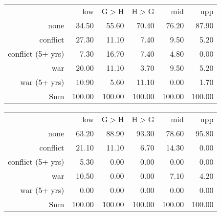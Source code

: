 \begin{table}[ht]
\centering
\begin{tabular}{rrrrrr}
\hline
                  & low    & G$>$H  & H$>$G  & mid    & upp \\
none              & 34.50  & 55.60  & 70.40  & 76.20  & 87.90 \\
conflict          & 27.30  & 11.10  & 7.40   & 9.50   & 5.20 \\
conflict (5+ yrs) & 7.30   & 16.70  & 7.40   & 4.80   & 0.00 \\
war               & 20.00  & 11.10  & 3.70   & 9.50   & 5.20 \\
war (5+ yrs)      & 10.90  & 5.60   & 11.10  & 0.00   & 1.70 \\
Sum               & 100.00 & 100.00 & 100.00 & 100.00 & 100.00 \\
\hline
\end{tabular}
\end{table}

\begin{table}[ht]
\centering
\begin{tabular}{rrrrrr}
\hline
                  & low    & G$>$H  & H$>$G  & mid    & upp \\
none              & 63.20  & 88.90  & 93.30  & 78.60  & 95.80 \\
conflict          & 21.10  & 11.10  & 6.70   & 14.30  & 0.00 \\
conflict (5+ yrs) & 5.30   & 0.00   & 0.00   & 0.00   & 0.00 \\
war               & 10.50  & 0.00   & 0.00   & 7.10   & 4.20 \\
war (5+ yrs)      & 0.00   & 0.00   & 0.00   & 0.00   & 0.00 \\
Sum               & 100.00 & 100.00 & 100.00 & 100.00 & 100.00 \\
\hline
\end{tabular}
\end{table}

